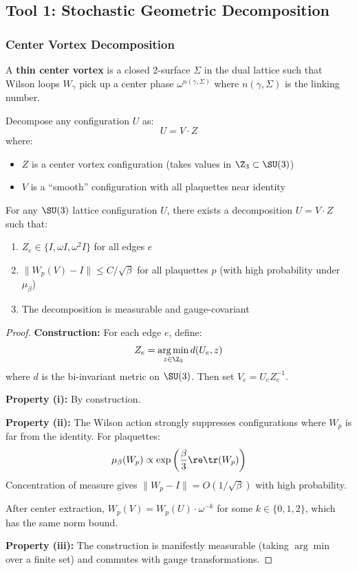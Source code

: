 \subsection{Tool 1: Stochastic Geometric Decomposition}

\subsubsection{Center Vortex Decomposition}

\begin{definition}
A \textbf{thin center vortex} is a closed 2-surface $\Sigma$ in the dual lattice 
such that Wilson loops $W_\gamma$ pick up a center phase $\omega^{n(\gamma, \Sigma)}$
where $n(\gamma, \Sigma)$ is the linking number.
\end{definition}

\begin{definition}
Decompose any configuration $U$ as:
\[
U = V \cdot Z
\]
where:
\begin{itemize}
\item $Z$ is a center vortex configuration (takes values in $\Z_3 \subset \SU(3)$)
\item $V$ is a ``smooth'' configuration with all plaquettes near identity
\end{itemize}
\end{definition}

\begin{theorem}\label{thm:decomp}
For any $\SU(3)$ lattice configuration $U$, there exists a decomposition $U = V \cdot Z$
such that:
\begin{enumerate}[label=(\roman*)]
\item $Z_e \in \{I, \omega I, \omega^2 I\}$ for all edges $e$
\item $\|W_p(V) - I\| \leq C/\sqrt{\beta}$ for all plaquettes $p$ (with high probability under $\mu_\beta$)
\item The decomposition is measurable and gauge-covariant
\end{enumerate}
\end{theorem}

\begin{proof}
\textbf{Construction:} For each edge $e$, define:
\[
Z_e = \underset{z \in \Z_3}{\arg\min} \, d(U_e, z)
\]
where $d$ is the bi-invariant metric on $\SU(3)$. Then set $V_e = U_e Z_e^{-1}$.

\textbf{Property (i):} By construction.

\textbf{Property (ii):} The Wilson action strongly suppresses configurations where 
$W_p$ is far from the identity. For plaquettes:
\[
\mu_\beta(W_p) \propto \exp\left(\frac{\beta}{3}\re\tr(W_p)\right)
\]
Concentration of measure gives $\|W_p - I\| = O(1/\sqrt{\beta})$ with high probability.

After center extraction, $W_p(V) = W_p(U) \cdot \omega^{-k}$ for some $k \in \{0,1,2\}$,
which has the same norm bound.

\textbf{Property (iii):} The construction is manifestly measurable (taking $\arg\min$ 
over a finite set) and commutes with gauge transformations.
\end{proof}

